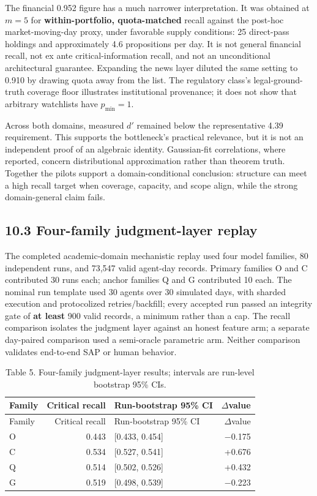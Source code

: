 \documentclass[
  11pt]{article}
\begin{document}
The financial 0.952 figure has a much narrower interpretation. It was obtained at \(m=5\) for \textbf{within-portfolio, quota-matched} recall against the post-hoc market-moving-day proxy, under favorable supply conditions: 25 direct-pass holdings and approximately 4.6 propositions per day. It is not general financial recall, not ex ante critical-information recall, and not an unconditional architectural guarantee. Expanding the news layer diluted the same setting to 0.910 by drawing quota away from the list. The regulatory class's legal-ground-truth coverage floor illustrates institutional provenance; it does not show that arbitrary watchlists have \(p_{\min}=1\).

Across both domains, measured \(d'\) remained below the representative 4.39 requirement. This supports the bottleneck's practical relevance, but it is not an independent proof of an algebraic identity. Gaussian-fit correlations, where reported, concern distributional approximation rather than theorem truth. Together the pilots support a domain-conditional conclusion: structure can meet a high recall target when coverage, capacity, and scope align, while the strong domain-general claim fails.

\subsection{10.3 Four-family judgment-layer replay}\label{four-family-judgment-layer-replay}

The completed academic-domain mechanistic replay used four model families, 80 independent runs, and 73,547 valid agent-day records. Primary families O and C contributed 30 runs each; anchor families Q and G contributed 10 each. The nominal run template used 30 agents over 30 simulated days, with sharded execution and protocolized retries/backfill; every accepted run passed an integrity gate of \textbf{at least} 900 valid records, a minimum rather than a cap. The recall comparison isolates the judgment layer against an honest feature arm; a separate day-paired comparison used a semi-oracle parametric arm. Neither comparison validates end-to-end SAP or human behavior.

\begin{longtable}[]{@{}lrlr@{}}
\caption{Table 5. Four-family judgment-layer results; intervals are run-level bootstrap 95\% CIs.}\tabularnewline
\toprule\noalign{}
Family & Critical recall & Run-bootstrap 95\% CI & \(\Delta\)value \\
\midrule\noalign{}
\endfirsthead
\toprule\noalign{}
Family & Critical recall & Run-bootstrap 95\% CI & \(\Delta\)value \\
\midrule\noalign{}
\endhead
\bottomrule\noalign{}
\endlastfoot
O & 0.443 & {[}0.433, 0.454{]} & −0.175 \\
C & 0.534 & {[}0.527, 0.541{]} & +0.676 \\
Q & 0.514 & {[}0.502, 0.526{]} & +0.432 \\
G & 0.519 & {[}0.498, 0.539{]} & −0.223 \\
\end{longtable}
\end{document}
